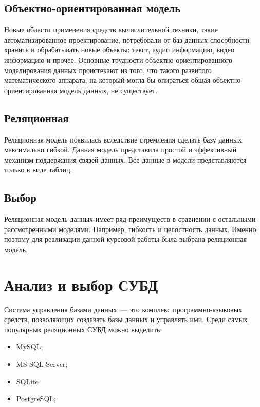 \subsection{Объектно-ориентированная модель}%
\label{sub:ob_ektno_orientirovannaia_model_}

Новые области применения средств вычислительной техники, такие автоматизированное проектирование, потребовали от баз данных способности хранить и обрабатывать новые объекты: текст, аудио информацию, видео информацию и прочее. Основные трудности объектно-ориентированного моделирования данных проистекают из того, что такого развитого математического аппарата, на который могла бы опираться общая объектно-ориентированная модель данных, не существует.

\subsection{Реляционная}%
\label{sub:reliatsionnaia}

Реляционная модель появилась вследствие стремления сделать базу данных максимально гибкой. Данная модель представила простой и эффективный механизм поддержания связей данных. Все данные в модели представляются только в виде таблиц.

\subsection{Выбор}%
\label{sub:vybor_db}

Реляционная модель данных имеет ряд преимуществ в сравнении с остальными рассмотренными моделями. Например, гибкость и целостность данных. Именно поэтому для реализации данной курсовой работы была выбрана реляционная модель.

\section{Анализ и выбор СУБД}%
\label{sec:analiz_i_vybor_subd}

Система управления базами данных~--- это комплекс программно-языковых средств, позволяющих создавать базы данных и управлять ими. Среди самых популярных реляционных СУБД можно выделить:
\begin{itemize}
    \item MySQL;
    \item MS SQL Server;
    \item SQLite
    \item PostgreSQL;
\end{itemize}

